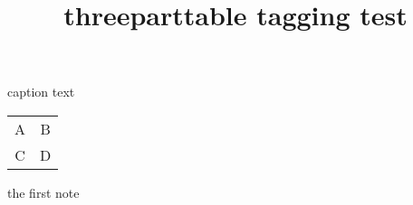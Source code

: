 \documentclass{article}
\title{threeparttable tagging test}
\begin{document}
\begin{threeparttable}
\caption{caption text}
\begin{tabular}{cc}
A\tnote{1} & B \\
C & D
\end{tabular}
\begin{tablenotes}
\item the first note
\end{tablenotes}
\end{threeparttable}
\end{document}

